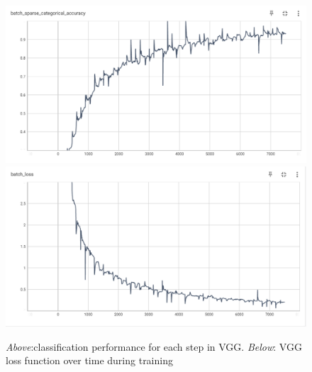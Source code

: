 \begin{figure}
    \centering
    \includegraphics[scale=0.35]{vgg16_batch_acc.png}
    \includegraphics[scale=0.35]{vgg16_batch_loss.png}
    \caption{\emph{Above}:classification performance for each step in VGG. \emph{Below}: VGG loss function over time during training}
    \label{fig:vgg_batch_results}
\end{figure}

